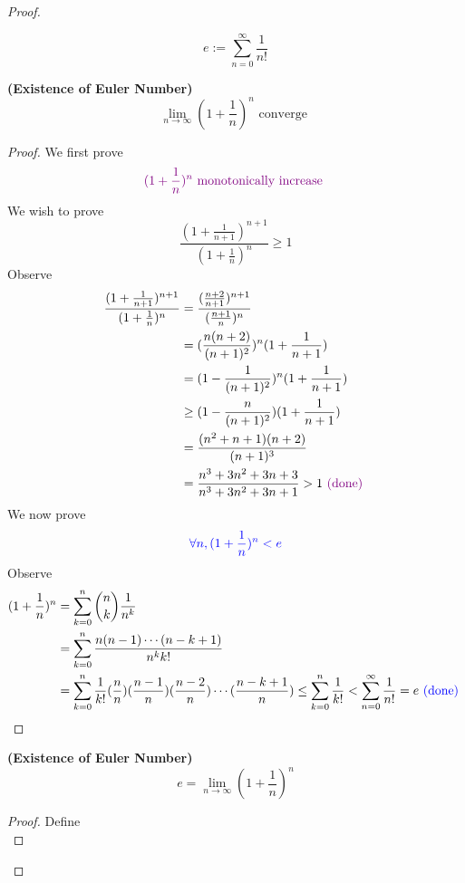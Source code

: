 \documentclass{report}
\begin{document}
\begin{proof}
\begin{definition}
\begin{equation}
e:=\sum_{n=0}^\infty \frac{1}{n!}
\end{equation}
\end{definition}
\begin{theorem}
\label{2.4.4}
\textbf{(Existence of Euler Number)}
\begin{equation}
\lim_{n\to\infty} (1+\frac{1}{n})^n\text{ converge }
\end{equation}
\end{theorem}
\begin{proof}
We first prove
\begin{equation}
\textcolor{violet}{(1+\frac{1}{n})^n\text{ monotonically increase }}
\end{equation}
We wish to prove
\begin{equation}
\frac{(1+\frac{1}{n+1})^{n+1}}{(1+\frac{1}{n})^n}\geq 1
\end{equation}
Observe
\begin{align}
\frac{(1+\frac{1}{n+1})^{n+1}}{(1+\frac{1}{n})^n}&=\frac{(\frac{n+2}{n+1})^{n+1}}{(\frac{n+1}{n})^n}\\
&=(\frac{n(n+2)}{(n+1)^2})^n(1+\frac{1}{n+1})\\
&=(1-\frac{1}{(n+1)^2})^n (1+\frac{1}{n+1})\\
&\geq (1-\frac{n}{(n+1)^2})(1+\frac{1}{n+1})\\
&=\frac{(n^2+n+1)(n+2)}{(n+1)^3}\\
&=\frac{n^3+3n^2+3n+3}{n^3+3n^2+3n+1}> 1\textcolor{violet}{\text{ (done) }}
\end{align}
We now prove
\begin{equation}
  \textcolor{blue}{\forall n,(1+\frac{1}{n})^n<e}
\end{equation}
Observe
\begin{align}
  (1+\frac{1}{n})^n&= \sum_{k=0}^n \binom{n}{k}\frac{1}{n^k}\\
  &=\sum_{k=0}^n \frac{n(n-1)\cdots (n-k+1)}{n^kk!}\\
  &=\sum_{k=0}^n \frac{1}{k!}(\frac{n}{n})(\frac{n-1}{n})(\frac{n-2}{n})\cdots (\frac{n-k+1}{n})\leq \sum_{k=0}^n \frac{1}{k!}<\sum_{n=0}^\infty \frac{1}{n!}=e\textcolor{blue}{\text{ (done) }}
\end{align}
\end{proof}
\begin{theorem}
\label{2.4.5}
\textbf{(Existence of Euler Number)} 
\begin{equation}
e=\lim_{n\to\infty}(1+\frac{1}{n})^n
\end{equation}
\end{theorem}
\begin{proof}
Define
\begin{equation}

\end{equation}
\end{proof}
\end{proof}
\end{document}
